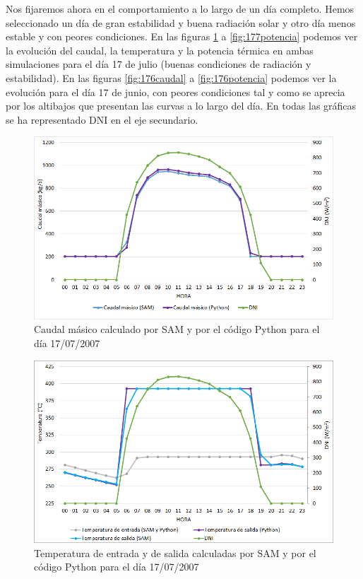 Nos fijaremos ahora en el comportamiento a lo largo de un día completo. Hemos seleccionado un día de gran estabilidad y buena radiación solar y otro día menos estable y con peores condiciones. En las figuras \ref{fig:177caudal}  a \ref{fig:177potencia} podemos ver la evolución del caudal, la temperatura y la potencia térmica en ambas simulaciones para el día 17 de julio (buenas condiciones de radiación y estabilidad). En las figuras \ref{fig:176caudal}  a \ref{fig:176potencia} podemos ver la evolución para el día 17 de junio, con peores condiciones tal y como se aprecia por los altibajos que presentan las curvas a lo largo del día. En todas las gráficas se ha representado DNI en el eje secundario.

\begin{figure}[H]
\includegraphics[width=0.9\linewidth]{images/177caudal.png}
\caption{Caudal másico calculado por SAM y por el código Python para el día 17/07/2007} 
\label{fig:177caudal}
\end{figure}

\begin{figure}[H]
\includegraphics[width=0.9\linewidth]{images/177temperatura.png}
\caption{Temperatura de entrada y de salida calculadas por SAM y por el código Python para el día 17/07/2007} 
\label{fig:177temperatura}
\end{figure}

